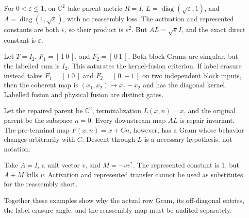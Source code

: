 \begin{example}
For \(0<\varepsilon\le1\), on \(\mathbb C^2\) take parent metric \(R=I\),
\(L=\operatorname{diag}(\sqrt\varepsilon,1)\), and
\(A=\operatorname{diag}(1,\sqrt\varepsilon)\), with no reassembly loss. The
activation and represented constants are both \(\varepsilon\), so their product
is \(\varepsilon^2\). But \(AL=\sqrt\varepsilon I\), and the exact direct
constant is \(\varepsilon\).
\end{example}

\begin{example}
Let \(T=I_2\), \(F_1=[\,1\ 0\,]\), and \(F_2=[\,0\ 1\,]\). Both block Grams
are singular, but the labelled sum is \(I_2\). This saturates the kernel-fusion
criterion. If label erasure instead takes \(F_1=[\,1\ 0\,]\) and
\(F_2=[\,0\ -1\,]\) on two independent block inputs, then the coherent map is
\((x_1,x_2)\mapsto x_1-x_2\) and has the diagonal kernel. Labelled fusion and
physical fusion are distinct gates.
\end{example}

\begin{example}
Let the repaired parent be \(\mathbb C^2\), terminalization \(L(x,n)=x\), and
the original parent be the subspace \(n=0\). Every downstream map \(AL\) is
repair invariant. The pre-terminal map \(F(x,n)=x+Cn\), however, has a Gram
whose behavior changes arbitrarily with \(C\). Descent through \(L\) is a
necessary hypothesis, not notation.
\end{example}

\begin{example}
Take \(A=I\), a unit vector \(v\), and \(M=-vv^*\). The represented constant is
\(1\), but \(A+M\) kills \(v\). Activation and represented transfer cannot be
used as substitutes for the reassembly short.
\end{example}

Together these examples show why the actual row Gram, its off-diagonal entries,
the label-erasure angle, and the reassembly map must be audited separately.
